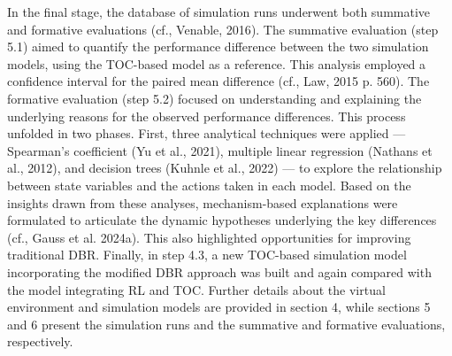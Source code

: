 In the final stage, the database of simulation runs underwent both
summative and formative evaluations (\colorbox{yellow!40}{cf., Venable, 2016}). The
summative evaluation (step 5.1) aimed to quantify the performance
difference between the two simulation models, using the TOC-based model
as a reference. This analysis employed a confidence interval for the
paired mean difference (\colorbox{yellow!40}{cf., Law, 2015 p. 560}). The formative
evaluation (step 5.2) focused on understanding and explaining the
underlying reasons for the observed performance differences. This
process unfolded in two phases. First, three analytical techniques were
applied --- Spearman's coefficient (\colorbox{yellow!40}{Yu et al., 2021}), multiple
linear regression (\colorbox{yellow!40}{Nathans et al., 2012}), and decision trees
(\colorbox{yellow!40}{Kuhnle et al., 2022}) --- to explore the relationship between state
variables and the actions taken in each model. Based on the insights
drawn from these analyses, mechanism-based explanations were formulated
to articulate the dynamic hypotheses underlying the key differences
(\colorbox{yellow!40}{cf., Gauss et al. 2024a}). This also highlighted opportunities for
improving traditional DBR. Finally, in step 4.3, a new TOC-based
simulation model incorporating the modified DBR approach was built and
again compared with the model integrating RL and TOC. Further details
about the virtual environment and simulation models are provided in
section 4, while sections 5 and 6 present the simulation runs and the
summative and formative evaluations, respectively.
